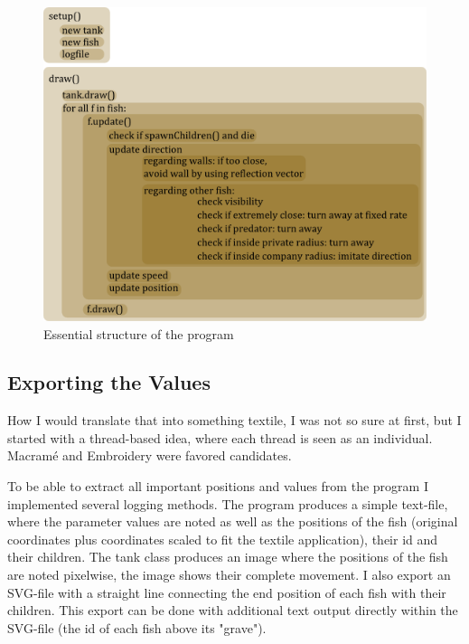 \documentclass{scrartcl}
\begin{document}
\begin{figure}[h]
        \centering
        \includegraphics[width=\textwidth]{implementationsketch}
        \caption{Essential structure of the program}
        
\end{figure}

\subsection{Exporting the Values}
How I would translate that into something textile, I was not so sure at first, but I started with a thread-based idea, where each thread is seen as an individual. Macramé and Embroidery were favored candidates.

To be able to extract all important positions and values from the program I implemented several logging methods. The program produces a simple text-file, where the parameter values are noted as well as the positions of the fish (original coordinates plus coordinates scaled to fit the textile application), their id and their children. The tank class produces an image where the positions of the fish are noted pixelwise, the image shows their complete movement. I also export an SVG-file with a straight line connecting the end position of each fish with their children. This export can be done with additional text output directly within the SVG-file (the id of each fish above its "grave").

\end{document}
